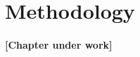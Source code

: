 
\chapter{Methodology} %

\label{Chapter:Methodology}

\subsubsection*{\color{mygray}[Chapter under work]}







